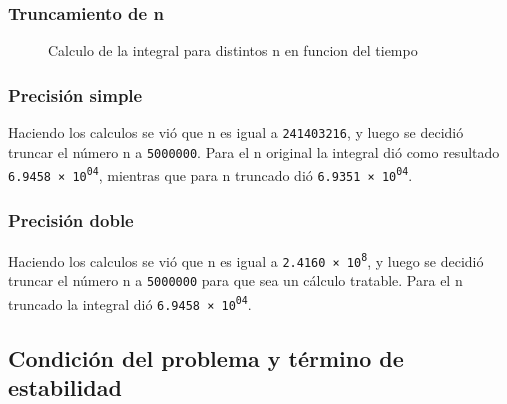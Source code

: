 \documentclass[11pt,a4paper]{article}
\begin{document}
\subsubsection{Truncamiento de n}

\begin{figure}[H]
	\caption{Calculo de la integral para distintos n en funcion del tiempo}
	\label{fig:calcularn}
\end{figure}

\subsubsection{Precisión simple}

Haciendo los calculos se vió que n es igual a \texttt{241403216}, y luego se decidió truncar el número n a \texttt{5000000}. Para el n original la integral dió como resultado \texttt{\num{6.9458e+04}}, mientras que para n truncado dió \texttt{\num{6.9351e+04}}.

\subsubsection{Precisión doble}

Haciendo los calculos se vió que n es igual a \texttt{\num{2.4160e8}}, y luego se decidió truncar el número n a \texttt{5000000} para que sea un cálculo tratable. Para el n truncado la integral dió \texttt{\num{6.9458e+04}}.

\subsection{Condición del problema y término de estabilidad}
\end{document}
